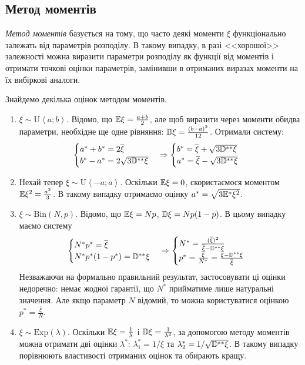 \subsection{Метод моментів}
\emph{Метод моментів} базується на тому, що часто деякі моменти $\xi$ функціонально залежать від параметрів розподілу.
В такому випадку, в разі <<хорошої>> залежності можна виразити параметри розподілу як функції від моментів і отримати точкові оцінки параметрів,
замінивши в отриманих виразах моменти на їх вибіркові аналоги.
\begin{example}
    Знайдемо декілька оцінок методом моментів.
    \begin{enumerate}
        \item $\xi \sim \mathrm{U}\left< a; b\right>$. Відомо, що $\mathbb{E} \xi = \frac{a+b}{2}$, але щоб виразити через моменти обидва параметри, необхідне ще одне рівняння:
        $\mathbb{D} \xi = \frac{(b-a)^2}{12}$. Отримали систему:
        $$ \begin{cases}
            a^* + b^* = 2\overline{\xi} \\
            b^* - a^* = 2\sqrt{3 \mathbb{D}^{**} \xi}
        \end{cases} \Rightarrow
        \begin{cases}
            b^* = \overline{\xi} + \sqrt{3 \mathbb{D}^{**} \xi} \\
            a^* = \overline{\xi} - \sqrt{3 \mathbb{D}^{**} \xi}
        \end{cases}$$
        \item Нехай тепер $\xi \sim \mathrm{U}\left< -a; a\right>$. Оскільки $\mathbb{E}\xi = 0$, скористаємося моментом $\mathbb{E}\xi^2 = \frac{a^2}{3}$. В такому випадку
        отримаємо оцінку $a^* = \sqrt{3 \mathbb{E}^{*}\xi^2}$.
        \item $\xi \sim \mathrm{Bin}(N, p)$. Відомо, що $\mathbb{E} \xi = Np$, $\mathbb{D} \xi = Np(1-p)$. В цьому випадку маємо систему 
        $$\begin{cases}
            N^* p^* = \overline{\xi} \\
            N^* p^* (1-p^*) = \mathbb{D}^{**} \xi 
        \end{cases} \Rightarrow
        \begin{cases}
            N^* = \frac{(\overline{\xi})^2}{\overline{\xi} - \mathbb{D}^{**}\xi} \\
            p^* = \frac{\overline{\xi}}{N^*} = \frac{\overline{\xi} - \mathbb{D}^{**}\xi}{\overline{\xi}}
        \end{cases}$$
        Незважаючи на формально правильний результат, застосовувати ці оцінки недоречно: немає жодної гарантії, що $N^*$ прийматиме лише натуральні значення.
        Але якщо параметр $N$ відомий, то можна користуватися оцінкою $p^* = \frac{\overline{\xi}}{N}$.
        \item $\xi \sim \mathrm{Exp}(\lambda)$. Оскільки $\mathbb{E} \xi = \frac{1}{\lambda}$ і $\mathbb{D} \xi = \frac{1}{\lambda^2}$, за допомогою методу моментів можна отримати дві оцінки $\lambda^*$:
        $\lambda_1^* = 1/{\overline{\xi}}$ та $\lambda_2^* = 1/{\sqrt{\mathbb{D}^{**}\xi}}$. В такому випадку порівнюють властивості отриманих оцінок та обирають кращу.
    \end{enumerate}
\end{example}
